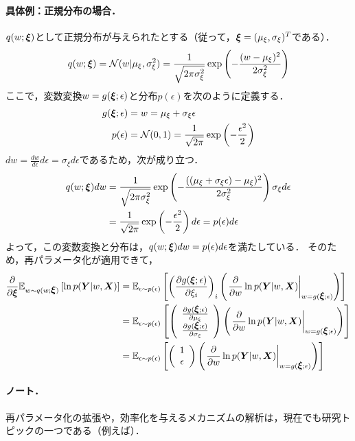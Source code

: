 \paragraph{具体例：正規分布の場合．}
$q(w;\mbox{\boldmath $\xi$})$として正規分布が与えられたとする（従って，$\mbox{\boldmath $\xi$}=(\mu_{\xi},\sigma_{\xi})^T$である）．
\begin{align*}
 q(w;\mbox{\boldmath $\xi$})
 =
 \mathcal{N}(w|\mu_{\xi},\sigma^2_{\xi})
 =
 \frac{1}{\sqrt{2\pi\sigma^2_{\xi}}} \exp\left( -\frac{(w-\mu_{\xi})^2}{2\sigma^2_{\xi}} \right)
\end{align*}
ここで，変数変換$w=g(\mbox{\boldmath $\xi$};\epsilon)$と分布$p(\epsilon)$を次のように定義する．
\begin{align*}
 g(\mbox{\boldmath $\xi$};\epsilon) &= w = \mu_{\xi}+\sigma_{\xi}\epsilon
 \\
 p(\epsilon) &= {\mathcal{N}}(0,1) = \frac{1}{\sqrt{2\pi}} \exp\left( -\frac{\epsilon^2}{2} \right)
\end{align*}
$dw = \frac{dw}{d\epsilon} d\epsilon = \sigma_{\xi}d\epsilon$であるため，次が成り立つ．
\begin{align*}
 q(w;\mbox{\boldmath $\xi$})dw
 &=
 \frac{1}{\sqrt{2\pi\sigma^2_{\xi}}} \exp\left( -\frac{((\mu_{\xi}+\sigma_{\xi}\epsilon) -\mu_{\xi})^2}{2\sigma^2_{\xi}} \right) \sigma_{\xi}d\epsilon
 \\
 &=
 \frac{1}{\sqrt{2\pi}} \exp\left( -\frac{\epsilon^2}{2} \right)d\epsilon = p(\epsilon) d\epsilon
\end{align*}
よって，この変数変換と分布は，$q(w;\mbox{\boldmath $\xi$})dw=p(\epsilon)d\epsilon$を満たしている．
そのため，再パラメータ化が適用できて，
\begin{align*}
\frac{\partial}{\partial \mbox{\boldmath $\xi$}}
\mathbb{E}_{w\sim q(w;\mbox{\boldmath $\xi$})}
\left[
\ln p(\mbox{\boldmath $Y$}|w,\mbox{\boldmath $X$})
\right]
&=
\mathbb{E}_{\epsilon\sim p(\epsilon)}
\left[
\left(
\frac{\partial g(\mbox{\boldmath $\xi$};\epsilon)}{\partial \xi_i}
\right)_i
\left(
\left. \frac{\partial}{\partial w} \ln p(\mbox{\boldmath $Y$}|w,\mbox{\boldmath $X$}) \right|_{w=g(\mbox{\boldmath $\xi$};\epsilon)}
\right)
\right]
\\
&=
\mathbb{E}_{\epsilon\sim p(\epsilon)}
\left[
\left(
     \begin{array}{c}
      \frac{\partial g(\mbox{\boldmath $\xi$};\epsilon)}{\partial \mu_{\xi} }  \\
      \frac{\partial g(\mbox{\boldmath $\xi$};\epsilon)}{\partial \sigma_{\xi} }
    \end{array}
\right)
\left(
\left. \frac{\partial}{\partial w} \ln p(\mbox{\boldmath $Y$}|w,\mbox{\boldmath $X$}) \right|_{w=g(\mbox{\boldmath $\xi$};\epsilon)}
\right)
\right]
\\
&=
\mathbb{E}_{\epsilon\sim p(\epsilon)}
\left[
\left(
     \begin{array}{c}
      1  \\
      \epsilon
    \end{array}
\right)
\left(
\left. \frac{\partial}{\partial w} \ln p(\mbox{\boldmath $Y$}|w,\mbox{\boldmath $X$}) \right|_{w=g(\mbox{\boldmath $\xi$};\epsilon)}
\right)
\right]
\end{align*}

\paragraph{ノート．}
再パラメータ化の拡張や，効率化を与えるメカニズムの解析は，現在でも研究トピックの一つである（例えば\cite{xu2019variance}）．
